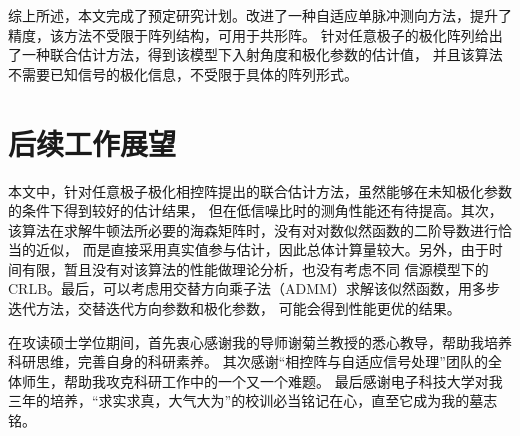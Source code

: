 \documentclass[master]{thesis-uestc}
\begin{document}
综上所述，本文完成了预定研究计划。改进了一种自适应单脉冲测向方法，提升了精度，该方法不受限于阵列结构，可用于共形阵。
针对任意极子的极化阵列给出了一种联合估计方法，得到该模型下入射角度和极化参数的估计值，
并且该算法不需要已知信号的极化信息，不受限于具体的阵列形式。

\section{后续工作展望}
本文中，针对任意极子极化相控阵提出的联合估计方法，虽然能够在未知极化参数的条件下得到较好的估计结果，
但在低信噪比时的测角性能还有待提高。其次，该算法在求解牛顿法所必要的海森矩阵时，没有对对数似然函数的二阶导数进行恰当的近似，
而是直接采用真实值参与估计，因此总体计算量较大。另外，由于时间有限，暂且没有对该算法的性能做理论分析，也没有考虑不同
信源模型下的CRLB。最后，可以考虑用交替方向乘子法（ADMM）求解该似然函数，用多步迭代方法，交替迭代方向参数和极化参数，
可能会得到性能更优的结果。

\thesisacknowledgement
在攻读硕士学位期间，首先衷心感谢我的导师谢菊兰教授的悉心教导，帮助我培养科研思维，完善自身的科研素养。
其次感谢“相控阵与自适应信号处理”团队的全体师生，帮助我攻克科研工作中的一个又一个难题。
最后感谢电子科技大学对我三年的培养，“求实求真，大气大为”的校训必当铭记在心，直至它成为我的墓志铭。








% 

% 
% 



\end{document}
